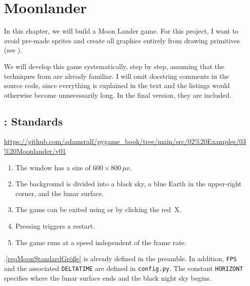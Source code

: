 \newpage
\section{Moonlander}
In this chapter, we will build a Moon Lander game. For this project, I want to avoid pre-made sprites and create all graphics entirely from drawing primitives (see ).

We will develop this game systematically, step by step, assuming that the techniques from  are already familiar. I will omit docstring comments in the source code, since everything is explained in the text and the listings would otherwise become unnecessarily long. In the final version, they are included.

\subsection{: Standards}
\begin{diskbox}
	\url{https://github.com/adamsralf/pygame_book/tree/main/src/02%20Examples/03%20Moonlander/v01}
\end{diskbox}

\begin{enumerate}
	\item The window has a size of $600\times \SI{800}{px}$.\label{reqMoonStandardGröße}
	\item The background is divided into a black sky, a blue Earth in the upper-right corner, and the lunar surface.\label{reqMoonStandardHintergrund}
	\item The game can be exited using \keys{\esc} or by clicking the red~X.\label{reqMoonStandardBeenden}
	\item Pressing  triggers a restart.
	\item The game runs at a speed independent of the frame rate.\label{reqMoonStandardFps}
\end{enumerate}
\er


.\ref{reqMoonStandardGröße} is already defined in the preamble. In addition, \texttt{FPS} and the associated \texttt{DELTATIME} are defined in \texttt{config.py}. The constant \texttt{HORIZONT} specifies where the lunar surface ends and the black night sky begins.

